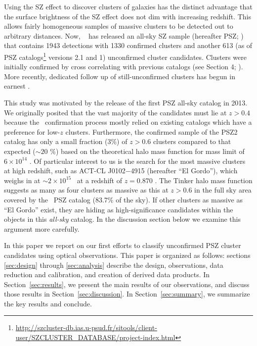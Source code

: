 \documentclass[apj, revtex4-1]{emulateapj}
\begin{document}
Using the SZ effect to discover clusters of galaxies has the distinct advantage that the surface brightness of the SZ effect does not dim with increasing redshift. This allows fairly homogeneous samples of massive clusters to be detected out to arbitrary distances. Now, \planck\ \citep{Tauber2010, PlanckCollaboration2011} has released an all-sky SZ sample (hereafter PSZ; \citealt{PlanckCollaboration2014, PlanckCollaboration2015a}) that contains 1943 detections with 1330 confirmed clusters and another 613 (as of PSZ catalogs\footnote{\url{http://szcluster-db.ias.u-psud.fr/sitools/client-user/SZCLUSTER_DATABASE/project-index.html}} versions 2.1 and 1) unconfirmed cluster candidates. Clusters were initially confirmed by cross correlating with previous catalogs (see Section 4; \citealt{PlanckCollaboration2014}). More recently, dedicated follow up of still-unconfirmed clusters has begun in earnest .

This study was motivated by the release of the first PSZ all-sky catalog in 2013. We originally posited that the vast majority of the candidates must lie at $z>0.4$ because the \planck\ confirmation process \citep{PlanckCollaboration2014} mostly relied on existing catalogs which have a preference for low-$z$ clusters. Furthermore, the confirmed sample of the PSZ2 catalog has only a small fraction (3\%) of $z > 0.6$ clusters compared to that expected ($\sim20$
\%) based on the theoretical halo mass function  for mass limit of $6\times10^{14}$ \msol. Of particular interest to us is the search for the most massive clusters at high redshift, such as ACT-CL J0102$-$4915 (hereafter ``El Gordo''), which weighs in at $\sim2 \times 10^{15}$ \msol\ at a redshift of $z=0.870$ \citep{Menanteau2012}. The Tinker halo mass function suggests as many as four clusters as massive as this at $z>0.6$ in the full sky area covered by the \planck\ PSZ catalog (83.7\% of the sky). If other clusters as massive as ``El Gordo'' exist, they are hiding as high-significance candidates within the objects in this \textit{all-sky} catalog. In the discussion section below we examine this argument more carefully.

In this paper we report on our first efforts to classify unconfirmed PSZ cluster candidates using optical observations. This paper is organized as follows: sections \ref{sec:design} through \ref{sec:analysis} describe the design, observations, data reduction and calibration, and creation of derived data products. In Section~\ref{sec:results}, we present the main results of our observations, and discuss those results in Section~\ref{sec:discussion}. In Section~\ref{sec:summary}, we summarize the key results and conclude.
\end{document}
